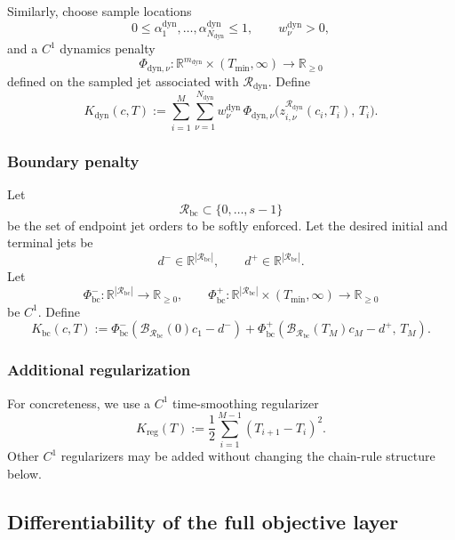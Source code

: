 Similarly, choose sample locations
\[
0\le \alpha_1^{\mathrm{dyn}},\dots,\alpha_{N_{\mathrm{dyn}}}^{\mathrm{dyn}}\le 1,
\qquad
w_\nu^{\mathrm{dyn}}>0,
\]
and a \(C^1\) dynamics penalty
\[
\Phi_{\mathrm{dyn},\nu}:\mathbb R^{m_{\mathrm{dyn}}}\times (T_{\min},\infty)\to\mathbb R_{\ge 0}
\]
defined on the sampled jet associated with \(\mathcal R_{\mathrm{dyn}}\).
Define
\begin{equation}
\label{eq:phase10_Kdyn}
K_{\mathrm{dyn}}(c,T)
:=
\sum_{i=1}^{M}\sum_{\nu=1}^{N_{\mathrm{dyn}}}
w_\nu^{\mathrm{dyn}}\,
\Phi_{\mathrm{dyn},\nu}
\bigl(
z_{i,\nu}^{\mathcal R_{\mathrm{dyn}}}(c_i,T_i),\,T_i
\bigr).
\end{equation}

\subsubsection{Boundary penalty}
\label{subsubsec:phase10_bc}

Let
\[
\mathcal R_{\mathrm{bc}}\subset\{0,\dots,s-1\}
\]
be the set of endpoint jet orders to be softly enforced.
Let the desired initial and terminal jets be
\[
d^- \in \mathbb R^{|\mathcal R_{\mathrm{bc}}|},
\qquad
d^+ \in \mathbb R^{|\mathcal R_{\mathrm{bc}}|}.
\]
Let
\[
\Phi_{\mathrm{bc}}^-:\mathbb R^{|\mathcal R_{\mathrm{bc}}|}\to\mathbb R_{\ge 0},
\qquad
\Phi_{\mathrm{bc}}^+:\mathbb R^{|\mathcal R_{\mathrm{bc}}|}\times (T_{\min},\infty)\to\mathbb R_{\ge 0}
\]
be \(C^1\).
Define
\begin{equation}
\label{eq:phase10_Kbc}
K_{\mathrm{bc}}(c,T)
:=
\Phi_{\mathrm{bc}}^-\!\left(
\mathcal B_{\mathcal R_{\mathrm{bc}}}(0)c_1-d^-
\right)
+
\Phi_{\mathrm{bc}}^+\!\left(
\mathcal B_{\mathcal R_{\mathrm{bc}}}(T_M)c_M-d^+,\,T_M
\right).
\end{equation}

\subsubsection{Additional regularization}
\label{subsubsec:phase10_reg}

For concreteness, we use a \(C^1\) time-smoothing regularizer
\begin{equation}
\label{eq:phase10_Kreg}
K_{\mathrm{reg}}(T)
:=
\frac12\sum_{i=1}^{M-1}(T_{i+1}-T_i)^2.
\end{equation}
Other \(C^1\) regularizers may be added without changing the chain-rule structure below.

\subsection{Differentiability of the full objective layer}
\label{subsec:phase10_diff}

